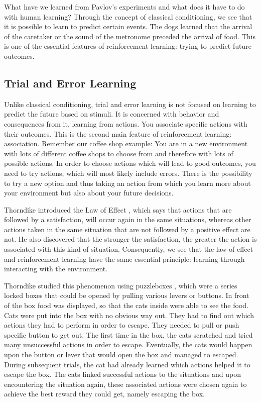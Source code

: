 What have we learned from Pavlov's experiments and what does it have to do with human learning? Through the concept of classical conditioning, we see that it is possible to learn to predict certain events. The dogs learned that the arrival of the caretaker or the sound of the metronome preceded the arrival of food. This is one of the essential features of reinforcement learning: trying to predict future outcomes.

\subsection{Trial and Error Learning}
Unlike classical conditioning, trial and error learning is not focused on learning to predict the future based on stimuli. It is concerned with behavior and consequences from it, learning from actions. You associate specific actions with their outcomes. This is the second main feature of reinforcement learning: association. 
Remember our coffee shop example: You are in a new environment with lots of different coffee shops to choose from and therefore with lots of possible actions. 
In order to choose actions which will lead to good outcomes, you need to try actions, which will most likely include errors.
There is the possibility to try a new option and thus taking an action from which you learn more about your environment but also about your future decisions. 

Thorndike introduced the Law of Effect \citep{thorndike1927law}, which says that actions that are followed by a satisfaction, will occur again in the same situations, whereas other actions taken in the same situation that are not followed by a positive effect are not. He also discovered that the stronger the satisfaction, the greater the action is associated with this kind of situation. Consequently, we see that the law of effect and reinforcement learning have the same essential principle: learning through interacting with the environment.

Thorndike studied this phenomenon using puzzleboxes \citep[pp.8-30]{thorndike1898animal}, which were a series locked boxes that could be opened by pulling various levers or buttons. In front of the box food was displayed, so that the cats inside were able to see the food. Cats were put into the box with no obvious way out. They had to find out which actions they had to perform in order to escape. They needed to pull or push specific button to get out.
The first time in the box, the cats scratched and tried many unsuccessful actions in order to escape. Eventually, the cats would happen upon the button or lever that would open the box and managed to escaped. During subsequent trials, the cat had already learned which actions helped it to escape the box.
The cats linked successful actions to the situations and upon encountering the situation again, these associated actions were chosen again to achieve the best reward they could get, namely escaping the box. 


